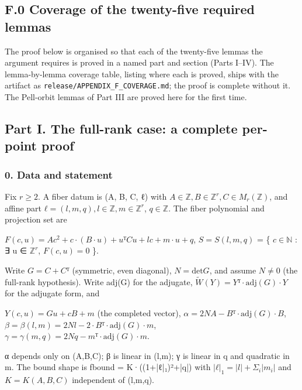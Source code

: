 \documentclass[11pt]{article}
\theoremstyle{plain}
\theoremstyle{definition}
\theoremstyle{remark}
\theoremstyle{plain}
\theoremstyle{definition}
\theoremstyle{remark}
\newcounter{Part}
\theoremstyle{plain}
\theoremstyle{definition}
\theoremstyle{remark}
\begin{document}
\subsection*{F.0 Coverage of the twenty-five required lemmas}
The proof below is organised so that each of the twenty-five lemmas the argument requires is proved in a named part and section (Parts I–IV). The lemma-by-lemma coverage table, listing where each is proved, ships with the artifact as \texttt{release/APPENDIX\_\allowbreak{}F\_\allowbreak{}COVERAGE.\allowbreak{}md}; the proof is complete without it. The Pell-orbit lemmas of Part III are proved here for the first time.

\subsection*{Part I. The full-rank case: a complete per-point proof}
\subsubsection*{0. Data and statement}
Fix $r ≥ 2$. A fiber datum is (A, B, C, ℓ) with $A ∈ ℤ, B ∈ ℤ^{r}, C ∈ M_{r}(ℤ)$, and affine part $ℓ = (l, m, q), l ∈ ℤ, m ∈ ℤ^{r}$, $q ∈ ℤ$. The fiber polynomial and projection set are

$F(c, u) = A c^{2} + c·(B·u) + uᵀCu + l c + m·u + q$,   $S = S(l,m,q)$ = \{ $c ∈ ℕ$ : ∃ u ∈ $ℤ^{r}$, $F(c,u) = 0$ \}.

Write $G = C + Cᵀ$ (symmetric, even diagonal), $N = \mathrm{det} G$, and assume $N ≠ 0$ (the full-rank hypothesis). Write adj(G) for the adjugate, $\tilde{W}(Y) = Yᵀ·\mathrm{adj}(G)·Y$ for the adjugate form, and

$Y(c,u) = G u + c B + m$        (the completed vector),   $α = 2NA − Bᵀ·\mathrm{adj}(G)·B$,   $β = β(l,m) = 2Nl − 2·Bᵀ·\mathrm{adj}(G)·m$,   $γ = γ(m,q) = 2Nq − mᵀ·\mathrm{adj}(G)·m$.

α depends only on (A,B,C); β is linear in (l,m); γ is linear in q and quadratic in m. The bound shape is fbound = K·((1+|ℓ|₁)²+|q|) with $|ℓ|_{1} = |l| + Σ_{i}|m_{i}|$ and $K = K(A,B,C)$ independent of (l,m,q).
\end{document}
